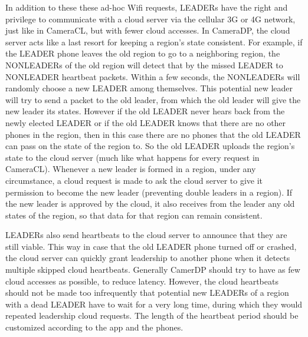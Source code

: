 In addition to these these ad-hoc Wifi requests, LEADERs have the right and privilege to communicate with a cloud server via the cellular 3G or 4G network, just like in CameraCL, but with fewer cloud accesses. In CameraDP, the cloud server acts like a last resort for keeping a region's state consistent. For example, if the LEADER phone leaves the old region to go to a neighboring region, the NONLEADERs of the old region will detect that by the missed LEADER to NONLEADER heartbeat packets. Within a few seconds, the NONLEADERs will randomly choose a new LEADER among themselves. This potential new leader will try to send a packet to the old leader, from which the old leader will give the new leader its states. However if the old LEADER never hears back from the newly elected LEADER or if the old LEADER knows that there are no other phones in the region, then in this case there are no phones that the old LEADER can pass on the state of the region to. So the old LEADER uploads the region's state to the cloud server (much like what happens for every request in CameraCL). Whenever a new leader is formed in a region, under any circumstance, a cloud request is made to ask the cloud server to give it permission to become the new leader (preventing double leaders in a region). If the new leader is approved by the cloud, it also receives from the leader any old states of the region, so that data for that region can remain consistent.

LEADERs also send heartbeats to the cloud server to announce that they are still viable. This way in case that the old LEADER phone turned off or crashed, the cloud server can quickly grant leadership to another phone when it detects multiple skipped cloud heartbeats. Generally CamerDP should try to have as few cloud accesses as possible, to reduce latency. However, the cloud heartbeats should not be made too infrequently that potential new LEADERs of a region with a dead LEADER have to wait for a very long time, during which they would repeated leadership cloud requests. The length of the heartbeat period should be customized according to the app and the phones.

